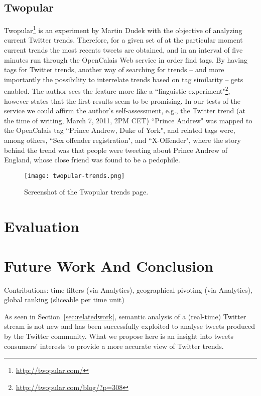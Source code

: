 \documentclass[runningheads,a4paper]{llncs}
\begin{document}
\subsection{Twopular}
Twopular\footnote{\url{http://twopular.com/}} is an experiment by Martin Dudek with the objective of analyzing current Twitter trends. Therefore, for a given set of at the particular moment current trends the most recents tweets are obtained, and in an interval of five minutes run through the OpenCalais Web service in order find tags. By having tags for Twitter trends, another way of searching for trends -- and more importantly the possibility to interrelate trends based on tag similarity -- gets enabled. The author sees the feature more like a ``linguistic experiment"\footnote{\url{http://twopular.com/blog/?p=308}}, however states that the first results seem to be promising. In our tests of the service we could affirm the author's self-assessment, e.g., the Twitter trend (at the time of writing, March 7, 2011, 2PM CET) ``Prince Andrew" was mapped to the OpenCalais tag ``Prince Andrew, Duke of York", and related tags were, among others,  ``Sex offender registration", and ``X-Offender", where the story behind the trend was that people were tweeting about Prince Andrew of England, whose close friend was found to be a pedophile.

\begin{figure}[h!]
  \centering
  \texttt{[image: twopular-trends.png]}
  \caption{Screenshot of the Twopular trends page.}
  \label{fig:twopular}
\end{figure}

\section{Evaluation}\label{sec:evaluation}

\section{Future Work And Conclusion}\label{sec:conclusion}
Contributions: time filters (via Analytics), geographical pivoting (via Analytics), global ranking (sliceable per time unit)

As seen in Section~\ref{sec:relatedwork}, semantic analysis of a (real-time) Twitter stream is not new and has been successfully exploited to analyse tweets produced by the Twitter community.
What we propose here is an insight into tweets consumers' interests to provide a more accurate view of Twitter trends.




\end{document}
